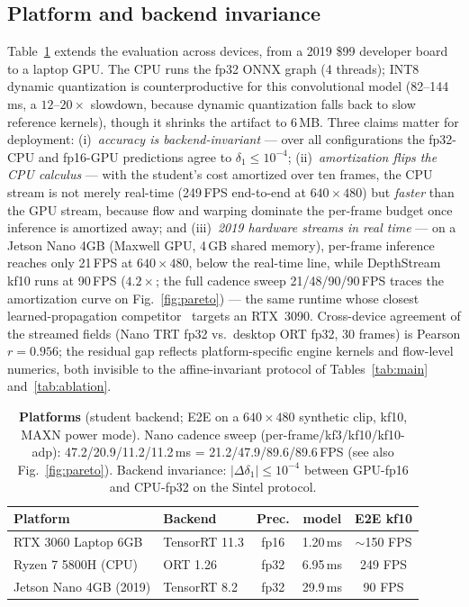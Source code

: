 \documentclass[10pt,twocolumn]{article}
\begin{document}
\subsection{Platform and backend invariance}
Table~\ref{tab:platform} extends the evaluation across devices, from a
2019 \$99 developer board to a laptop GPU. The CPU runs the fp32 ONNX graph
(4 threads); INT8 dynamic quantization is counterproductive for this
convolutional model (82--144\,ms, a $12$--$20\times$ slowdown, because
dynamic quantization falls back to slow reference kernels), though it
shrinks the artifact to 6\,MB. Three claims matter for deployment:
(i)~\emph{accuracy is backend-invariant} --- over all configurations the
fp32-CPU and fp16-GPU predictions agree to $\delta_1 \leq 10^{-4}$;
(ii)~\emph{amortization flips the CPU calculus} --- with the student's cost
amortized over ten frames, the CPU stream is not merely real-time
(249\,FPS end-to-end at $640{\times}480$) but \emph{faster} than the GPU
stream, because flow and warping dominate the per-frame budget once
inference is amortized away; and (iii)~\emph{2019 hardware streams in real
time} --- on a Jetson Nano 4GB (Maxwell GPU, 4\,GB shared memory), per-frame
inference reaches only 21\,FPS at $640{\times}480$, below the real-time
line, while DepthStream kf10 runs at 90\,FPS ($4.2\times$; the full cadence
sweep 21/48/90/90\,FPS traces the amortization curve on
Fig.~\ref{fig:pareto}) --- the same
runtime whose closest learned-propagation competitor~\cite{velodepth}
targets an RTX~3090. Cross-device agreement of the streamed fields
(Nano TRT fp32 vs.\ desktop ORT fp32, 30 frames) is Pearson $r{=}0.956$;
the residual gap reflects platform-specific engine kernels and flow-level
numerics, both invisible to the affine-invariant protocol of
Tables~\ref{tab:main} and~\ref{tab:ablation}.

\begin{table}[t]
\centering\small
\caption{\textbf{Platforms} (student backend; E2E on a $640{\times}480$
synthetic clip, kf10, MAXN power mode). Nano cadence sweep
(per-frame/kf3/kf10/kf10-adp): 47.2/20.9/11.2/11.2\,ms
= 21.2/47.9/89.6/89.6\,FPS (see also Fig.~\ref{fig:pareto}).
Backend invariance: $|\Delta\delta_1| \leq 10^{-4}$ between GPU-fp16 and
CPU-fp32 on the Sintel protocol.}
\label{tab:platform}
\begin{tabular}{llccc}
\toprule
Platform & Backend & Prec. & model & E2E kf10\\
\midrule
RTX 3060 Laptop 6GB & TensorRT 11.3 & fp16 & 1.20\,ms & $\sim$150 FPS\\
Ryzen 7 5800H (CPU) & ORT 1.26 & fp32 & 6.95\,ms & 249 FPS\\
Jetson Nano 4GB (2019) & TensorRT 8.2 & fp32 & 29.9\,ms & 90 FPS\\
\bottomrule
\end{tabular}
\end{table}
\end{document}
